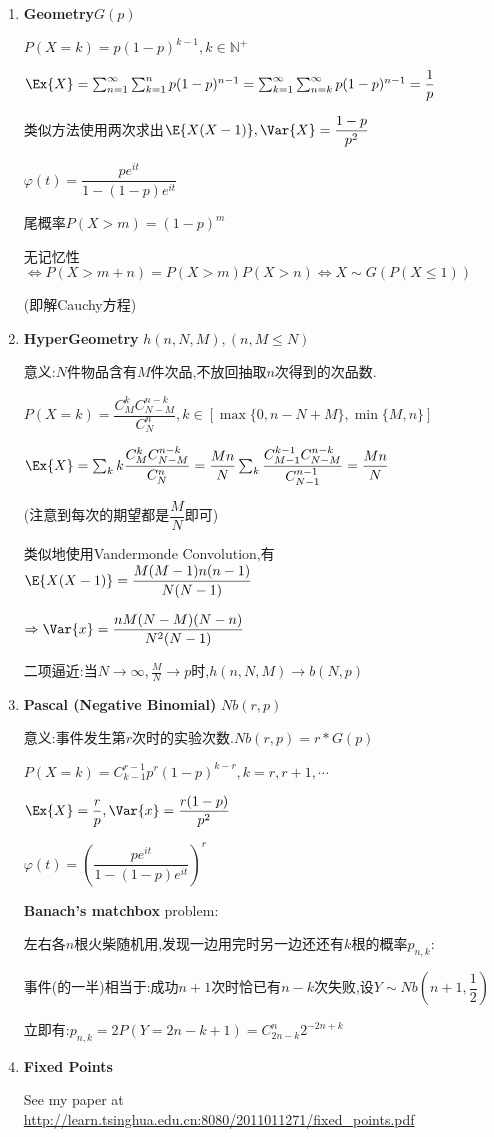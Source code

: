 \begin{enumerate}
    \item \textbf{Geometry}$ G(p)$

      $ P(X=k) = p(1-p)^{k-1}, k \in \mathbb{N^+}$

      $ \Ex{X} = \sum_{n=1}^{\infty}\sum_{k=1}^{n}{p(1-p)^{n-1}}=
      \sum_{k=1}^{\infty}\sum_{n=k}^{\infty}{p(1-p)^{n-1}}= \dfrac{1}{p}$

      类似方法使用两次求出$ \E{X(X-1)},\Var{X} = \dfrac{1-p}{p^2}$

      $ \varphi(t) = \dfrac{pe^{it}}{1-(1-p)e^{it}}$

      尾概率$ P(X>m) = (1-p)^m$

      无记忆性 $\Leftrightarrow P(X>m+n) = P(X>m)P(X>n)\Leftrightarrow X\sim G(P(X\le 1)) $

          (即解Cauchy方程)

        \item \textbf{HyperGeometry} $ h(n,N,M),(n, M\le N)$

          意义:$ N$件物品含有$ M$件次品,不放回抽取$ n$次得到的次品数.

          $ P(X=k) = \dfrac{C_M^kC_{N-M}^{n-k}}{C_N^n}, k \in [\max\{0, n-N + M\}, \min\{M,n\}]$

          $ \Ex{X} = \sum_{k}{k\dfrac{C_M^kC_{N-M}^{n-k}}{C_N^n}}  = \dfrac{Mn}{N}\sum_{k}{\dfrac{C_{M-1}^{k-1}C_{N-M}^{n-k}}{C_{N-1}^{n-1}}} = \dfrac{Mn}{N}$

          (注意到每次的期望都是$ \dfrac{M}{N}$即可)

          类似地使用Vandermonde Convolution,有$ 	\E{X(X-1)} = \dfrac{M(M-1)n(n-1)}{N(N-1)}$

          $\Rightarrow \Var{x}  = \dfrac{nM(N-M)(N-n)}{N^2(N-1)} $

        二项逼近:当$N\to\infty, \frac{M}{N}\to p $时,$ h(n,N,M)\to b(N,p)$

      \item \textbf{Pascal (Negative Binomial)} $ Nb(r,p)$

        意义:事件发生第$ r$次时的实验次数.$ Nb(r, p) = r * G(p) $

        $ P(X = k) = C_{k-1}^{r-1}p^r(1-p)^{k-r}, k = r,r+1,\cdots$

        $ \Ex{X} = \dfrac{r}{p}, \Var{x} = \dfrac{r(1-p)}{p^2}$

        $ \varphi(t) = (\dfrac{pe^{it}}{1-(1-p)e^{it}})^r$

        \textbf{Banach's matchbox} problem:

        左右各$ n$根火柴随机用,发现一边用完时另一边还还有$ k$根的概率$ p_{n,k}$:

        事件(的一半)相当于:成功$ n+1$次时恰已有$ n-k$次失败,设$ Y\sim Nb(n+1, \dfrac{1}{2})$

        立即有:$ p_{n,k} = 2P(Y = 2n-k+1) = C_{2n-k}^{n}2^{-2n+k}$

      \item \textbf{Fixed Points}

        See my paper at \url{http://learn.tsinghua.edu.cn:8080/2011011271/fixed_points.pdf}

    \end{enumerate}
